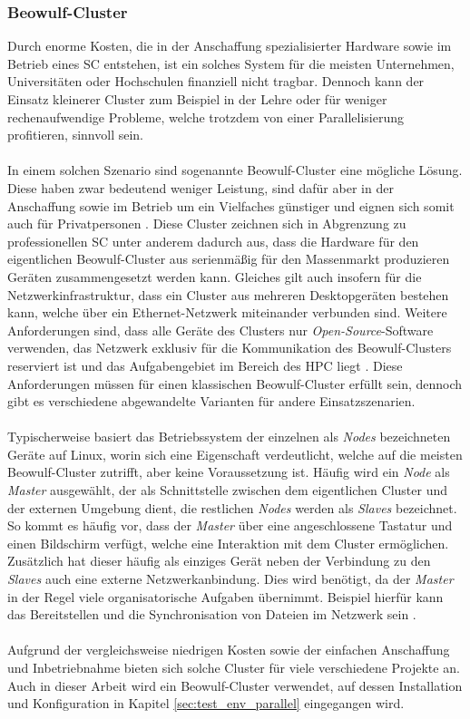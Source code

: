 \subsubsection{Beowulf-Cluster}
\label{subsubsec:beowulf_cluster}
Durch enorme Kosten, die in der Anschaffung spezialisierter Hardware \cite{brown2004engineering} sowie im Betrieb eines \ac{SC} \cite{nielsen2016introduction} entstehen, ist ein solches System für die meisten Unternehmen, Universitäten oder Hochschulen finanziell nicht tragbar. Dennoch kann der Einsatz kleinerer Cluster zum Beispiel in der Lehre oder für weniger rechenaufwendige Probleme, welche trotzdem von einer Parallelisierung profitieren, sinnvoll sein. 
\\\\
In einem solchen Szenario sind sogenannte Beowulf-Cluster eine mögliche Lösung. Diese haben zwar bedeutend weniger Leistung, sind dafür aber in der Anschaffung sowie im Betrieb um ein Vielfaches günstiger und eignen sich somit auch für Privatpersonen \cite{adams2008microwulf}. Diese Cluster zeichnen sich in Abgrenzung zu professionellen \ac{SC} unter anderem dadurch aus, dass die Hardware für den eigentlichen Beowulf-Cluster aus serienmäßig für den Massenmarkt produzieren Geräten zusammengesetzt werden kann. Gleiches gilt auch insofern für die Netzwerkinfrastruktur, dass ein Cluster aus mehreren Desktopgeräten bestehen kann, welche über ein Ethernet-Netzwerk miteinander verbunden sind. Weitere Anforderungen sind, dass alle Geräte des Clusters nur \emph{Open-Source}-Software verwenden, das Netzwerk exklusiv für die Kommunikation des Beowulf-Clusters reserviert ist und das Aufgabengebiet im Bereich des \ac{HPC} liegt \cite{brown2004engineering}. Diese Anforderungen müssen für einen klassischen Beowulf-Cluster erfüllt sein, dennoch gibt es verschiedene abgewandelte Varianten für andere Einsatzszenarien.
\\\\
Typischerweise basiert das Betriebssystem der einzelnen als \emph{Nodes} bezeichneten Geräte auf Linux, worin sich eine Eigenschaft verdeutlicht, welche auf die meisten Beowulf-Cluster zutrifft, aber keine Voraussetzung ist. Häufig wird ein \emph{Node} als \emph{Master} ausgewählt, der als Schnittstelle zwischen dem eigentlichen Cluster und der externen Umgebung dient, die restlichen \emph{Nodes} werden als \emph{Slaves} bezeichnet. So kommt es häufig vor, dass der \emph{Master} über eine angeschlossene Tastatur und einen Bildschirm verfügt, welche eine Interaktion mit dem Cluster ermöglichen. Zusätzlich hat dieser häufig als einziges Gerät neben der Verbindung zu den \emph{Slaves} auch eine externe Netzwerkanbindung. Dies wird benötigt, da der \emph{Master} in der Regel viele organisatorische Aufgaben übernimmt. Beispiel hierfür kann das Bereitstellen und die Synchronisation von Dateien im Netzwerk sein \cite{brown2004engineering}.
\\\\
Aufgrund der vergleichsweise niedrigen Kosten sowie der einfachen Anschaffung und Inbetriebnahme bieten sich solche Cluster für viele verschiedene Projekte an. Auch in dieser Arbeit wird ein Beowulf-Cluster verwendet, auf dessen Installation und Konfiguration in Kapitel \ref{sec:test_env_parallel} eingegangen wird.

